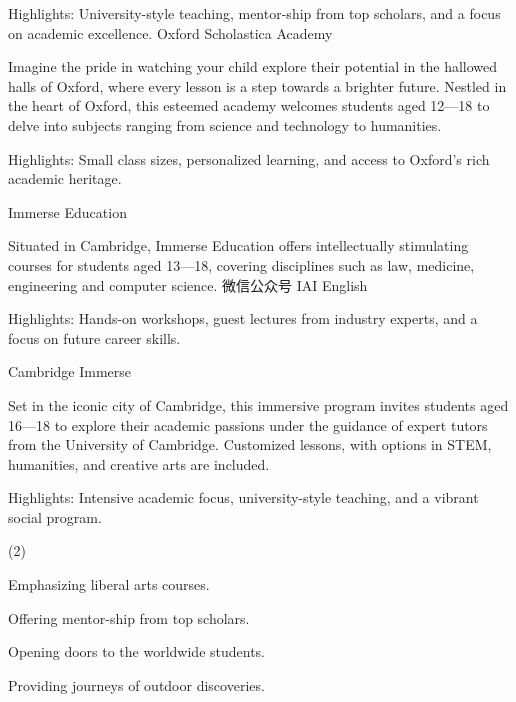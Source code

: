 \documentclass{英语试卷}
\begin{document}
\par Highlights: University-style teaching, mentor-ship from top scholars, and a focus on academic excellence. Oxford Scholastica Academy\par
\par Imagine the pride in watching your child explore their potential in the hallowed halls of Oxford, where every lesson is a step towards a brighter future. Nestled in the heart of Oxford, this esteemed academy welcomes students aged 12—18 to delve into subjects ranging from science and technology to humanities.\par
\par Highlights: Small class sizes, personalized learning, and access to Oxford's rich academic heritage.\par
\par Immerse Education\par
\par Situated in Cambridge, Immerse Education offers intellectually stimulating courses for students aged 13—18, covering disciplines such as law, medicine, engineering and computer science. 微信公众号 IAI English\par
\par Highlights: Hands-on workshops, guest lectures from industry experts, and a focus on future career skills.\par
\par Cambridge Immerse\par
\par Set in the iconic city of Cambridge, this immersive program invites students aged 16—18 to explore their academic passions under the guidance of expert tutors from the University of Cambridge. Customized lessons, with options in STEM, humanities, and creative arts are included.\par
\par Highlights: Intensive academic focus, university-style teaching, and a vibrant social program.\par
{}
\begin{choices}(2)
  \item Emphasizing liberal arts courses.
  \item Offering mentor-ship from top scholars.
  \item Opening doors to the worldwide students.
  \item Providing journeys of outdoor discoveries.
\end{choices}
\end{document}

